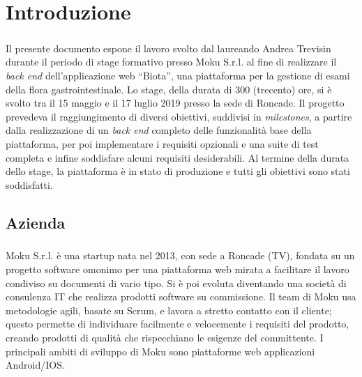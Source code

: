 
\chapter{Introduzione}
\label{introduction}
\paragraph{}
Il presente documento espone il lavoro svolto dal laureando Andrea Trevisin durante il periodo di stage formativo presso Moku S.r.l. al fine di realizzare il \textit{back end} dell'applicazione web ``Biota'', una piattaforma per la gestione di esami della flora gastrointestinale.
Lo stage, della durata di 300 (trecento) ore, si è svolto tra il 15 maggio e il 17 luglio 2019 presso la sede di Roncade. Il progetto prevedeva il raggiungimento di diversi obiettivi, suddivisi in \textit{milestones}, a partire dalla realizzazione di un \textit{back end} completo delle funzionalità base della piattaforma, per poi implementare i requisiti opzionali e una suite di test completa e infine soddisfare alcuni requisiti desiderabili.
Al termine della durata dello stage, la piattaforma è in stato di produzione e tutti gli obiettivi sono stati soddisfatti.

\section{Azienda}
\paragraph{}
Moku S.r.l. è una startup nata nel 2013, con sede a Roncade (TV), fondata su un progetto software omonimo per una piattaforma web mirata a facilitare il lavoro condiviso su documenti di vario tipo. Si è poi evoluta diventando una società di consulenza IT che realizza prodotti software su commissione. 
Il team di Moku usa metodologie agili, basate su Scrum, e lavora a stretto contatto con il cliente; questo permette di individuare facilmente e velocemente i requisiti del prodotto, creando prodotti di qualità che rispecchiano le esigenze del committente. I principali ambiti di sviluppo di Moku sono piattaforme web applicazioni Android/IOS.

